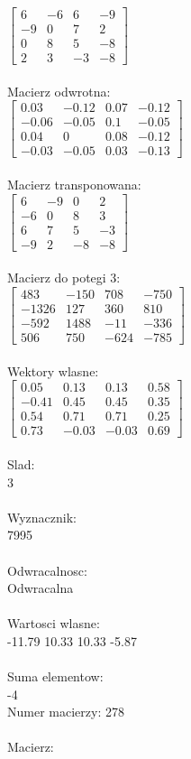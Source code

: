 \documentclass[a4paper,12pt]{article}
\begin{document}
$\begin{bmatrix} 6&-6&6&-9\\-9&0&7&2\\0&8&5&-8\\2&3&-3&-8 \end{bmatrix}$
\\
\\
Macierz odwrotna:\\

$\begin{bmatrix} 0.03&-0.12&0.07&-0.12\\-0.06&-0.05&0.1&-0.05\\0.04&0&0.08&-0.12\\-0.03&-0.05&0.03&-0.13 \end{bmatrix}$
\\
\\
Macierz transponowana:\\

$\begin{bmatrix} 6&-9&0&2\\-6&0&8&3\\6&7&5&-3\\-9&2&-8&-8 \end{bmatrix}$
\\
\\
Macierz do potegi 3:\\

$\begin{bmatrix} 483&-150&708&-750\\-1326&127&360&810\\-592&1488&-11&-336\\506&750&-624&-785 \end{bmatrix}$
\\
\\
Wektory wlasne:\\

$\begin{bmatrix} 0.05&0.13&0.13&0.58\\-0.41&0.45&0.45&0.35\\0.54&0.71&0.71&0.25\\0.73&-0.03&-0.03&0.69 \end{bmatrix}$
\\
\\
Slad:\\
3
\\
\\
Wyznacznik:\\
7995
\\
\\
Odwracalnosc:\\
Odwracalna
\\
\\
Wartosci wlasne:\\
-11.79 10.33 10.33 -5.87
\\
\\
Suma elementow:\\
-4
\\
\newpage
Numer macierzy:
278
\\
\\
Macierz:\\
\end{document}
